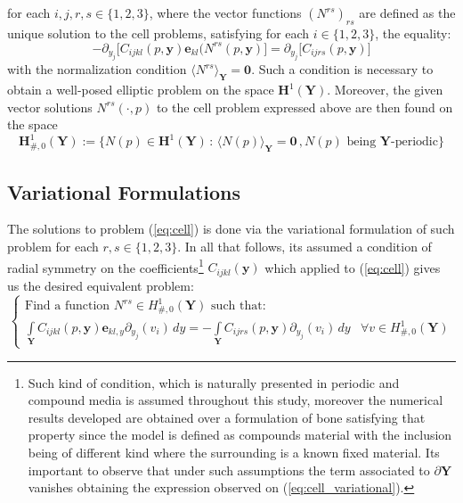 for each $ i,j,r,s \in \{1,2,3\}$, where the vector functions $(N^{rs})_{rs}$ are defined as the unique solution to the cell problems, satisfying for each $i \in \{1,2,3\}$, the equality:
\begin{equation}
    \label{eq:cell}
    -\partial_{y_j} \big[ C_{ijkl}(p,\mathbf{y}) \mathbf{e}_{kl}(N^{rs}(p,\mathbf{y}) \big] = \partial_{y_j} \big[ C_{ijrs}(p,\mathbf{y}) \big] 
\end{equation}
with the normalization condition $\langle N^{rs} \rangle_{\mathbf{Y}} = \mathbf{0}$. Such a condition is necessary to obtain a well-posed elliptic problem on the space $\mathbf{H}^1(\mathbf{Y})$.
Moreover, the given vector solutions $N^{rs}(\cdot,p)$ to the cell problem expressed above are then found on the space
\begin{equation*}
    \mathbf{H}^1_{\#, 0} (\mathbf{Y}) := \big \{ N(p) \in  \mathbf{H}^1(\mathbf{Y}) \, : \, \langle N(p) \rangle_{\mathbf{Y}}=\mathbf{0} \,, N(p) \text{ being } \mathbf{Y}\text{-periodic} \big \}
\end{equation*}
\subsection{Variational Formulations}
The solutions to problem (\ref{eq:cell}) is done via the variational formulation of such problem for each $r,s \in \{1,2,3\}$. In all that follows, its assumed a condition of radial symmetry on the coefficients\footnote{Such kind of condition, which is naturally presented in periodic and compound media is assumed throughout this study, moreover the numerical results developed are obtained over a formulation of bone satisfying that property since the model is defined as compounds material with the inclusion being of different kind where the surrounding is a known fixed material. Its important to observe that under such assumptions the term associated to $\partial \mathbf{Y}$ vanishes obtaining the expression observed on (\ref{eq:cell_variational}).} $C_{ijkl}(\mathbf{y})$ which applied to (\ref{eq:cell}) gives us the desired equivalent problem:
\begin{equation}
    \label{eq:cell_variational}
    \left \{
    \begin{array}{cc}
        \text{Find a function        } N^{rs} \in H^1_{\#,0}(\mathbf{Y}) \text{ such that: } & \quad \\
        \int\limits_{\mathbf{Y}} C_{ijkl}(p,\mathbf{y})\mathbf{e}_{kl,y} \partial_{y_j}(v_i)\,dy = -\int\limits_{\mathbf{Y}} C_{ijrs}(p, \mathbf{y}) \partial_{y_j}(v_i)\,dy &  \forall v \in H^1_{\#, 0}(\mathbf{Y})
    \end{array}
    \right.
\end{equation}


